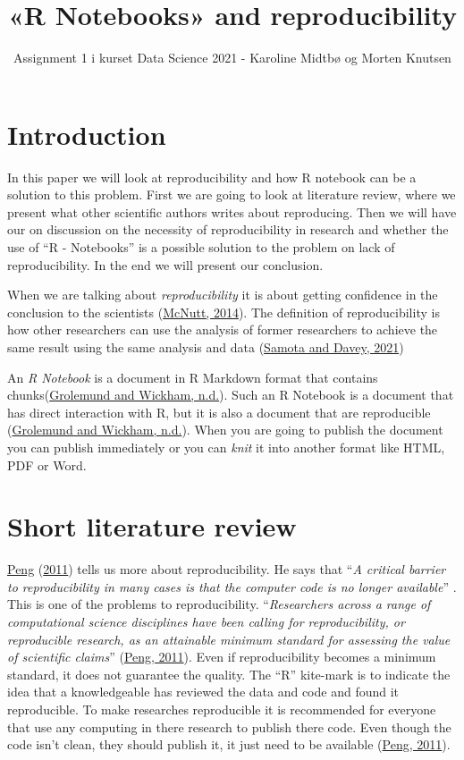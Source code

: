 \documentclass[
  12pt,
]{article}
\title{«R Notebooks» and reproducibility}
\author{Assignment 1 i kurset Data Science 2021 - Karoline Midtbø og
Morten Knutsen}
\date{}
\begin{document}
\maketitle

\hypertarget{introduction}{%
\section{Introduction}\label{introduction}}

In this paper we will look at reproducibility and how R notebook can be
a solution to this problem. First we are going to look at literature
review, where we present what other scientific authors writes about
reproducing. Then we will have our on discussion on the necessity of
reproducibility in research and whether the use of ``R - Notebooks'' is
a possible solution to the problem on lack of reproducibility. In the
end we will present our conclusion.

When we are talking about \emph{reproducibility} it is about getting
confidence in the conclusion to the scientists
(\protect\hyperlink{ref-mcnutt2014}{McNutt, 2014}). The definition of
reproducibility is how other researchers can use the analysis of former
researchers to achieve the same result using the same analysis and data
(\protect\hyperlink{ref-samota2021}{Samota and Davey, 2021})

An \emph{R Notebook} is a document in R Markdown format that contains
chunks(\protect\hyperlink{ref-grolemund}{Grolemund and Wickham, n.d.}).
Such an R Notebook is a document that has direct interaction with R, but
it is also a document that are reproducible
(\protect\hyperlink{ref-grolemund}{Grolemund and Wickham, n.d.}). When
you are going to publish the document you can publish immediately or you
can \emph{knit} it into another format like HTML, PDF or Word.

\hypertarget{short-literature-review}{%
\section{Short literature review}\label{short-literature-review}}

\protect\hyperlink{ref-peng2011}{Peng}
(\protect\hyperlink{ref-peng2011}{2011}) tells us more about
reproducibility. He says that ``\emph{A critical barrier to
reproducibility in many cases is that the computer code is no longer
available}'' . This is one of the problems to reproducibility.
``\emph{Researchers across a range of computational science disciplines
have been calling for reproducibility, or reproducible research, as an
attainable minimum standard for assessing the value of scientific
claims}'' (\protect\hyperlink{ref-peng2011}{Peng, 2011}). Even if
reproducibility becomes a minimum standard, it does not guarantee the
quality. The ``R'' kite-mark is to indicate the idea that a
knowledgeable has reviewed the data and code and found it reproducible.
To make researches reproducible it is recommended for everyone that use
any computing in there research to publish there code. Even though the
code isn't clean, they should publish it, it just need to be available
(\protect\hyperlink{ref-peng2011}{Peng, 2011}).
\end{document}
